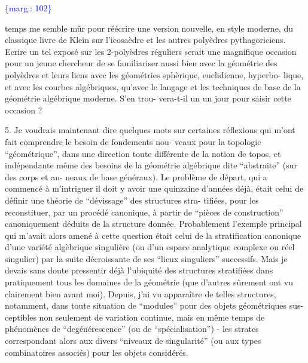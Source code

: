 \documentclass[11pt]{article}
\newcommand{\scanpage}[1]{\par\bigskip\noindent{\small\sffamily[scan #1]}\par}
\newcommand{\mspage}[1]{{\small\sffamily[p.\,#1]}}
\newcommand{\margin}[1]{\textcolor{blue}{\{\textsf{marg.:} #1\}}}
\begin{document}
\margin{102}

\clearpage
\scanpage{119/103}
\mspage{25}

temps me semble mûr pour réécrire une version nouvelle, en style
moderne, du classique livre de Klein sur l'icosaèdre et les autres
polyèdres pythagoriciens. Ecrire un tel exposé sur les 2-polyèdres
réguliers serait une magnifique occasion pour un jeune chercheur
de se familiariser aussi bien avec la géométrie des polyèdres et
leurs liens avec les géométries sphèrique, euclidienne, hyperbo-%
lique, et avec les courbes algébriques, qu'avec le langage et les
techniques de base de la géométrie algébrique moderne. S'en trou-%
vera-t-il un un jour pour saisir cette occasion ?

5. \qquad Je voudrais maintenant dire quelques mots sur certaines
réflexions qui m'ont fait comprendre le besoin de fondements nou-%
veaux pour la topologie ``géométrique'', dans une direction toute
différente de la notion de topos, et indépendante même des besoins
de la géométrie algébrique dite ``abstraite'' (sur des corps et an-%
neaux de base généraux). Le problème de départ, qui a commencé à
m'intriguer il doit y avoir une quinzaine d'années déjà, était
celui de définir une théorie de ``dévissage'' des structures stra-%
tifiées, pour les reconstituer, par un procédé canonique, à partir
de ``pièces de construction'' canoniquement déduits de la structure
donnée. Probablement l'exemple principal qui m'avait alors amené
à cette question était celui de la stratification canonique d'une
variété algèbrique singulière (ou d'un espace analytique complexe
ou réel singulier) par la suite décroissante de ses ``lieux singuliers''
successifs. Mais je devais sans doute pressentir déjà l'ubiquité
des structures stratifiées dans pratiquement tous les domaines de
la géométrie (que d'autres sûrement ont vu clairement bien avant
moi). Depuis, j'ai vu apparaître de telles structures, notamment,
dans toute situation de ``modules'' pour des objets géométriques sus-%
ceptibles non seulement de variation continue, mais en même temps
de phénomènes de ``degénérescence'' (ou de ``spécialisation'') - les
strates correspondant alors aux divers ``niveaux de singularité''
(ou aux types combinatoires associés) pour les objets considérés.
\end{document}

